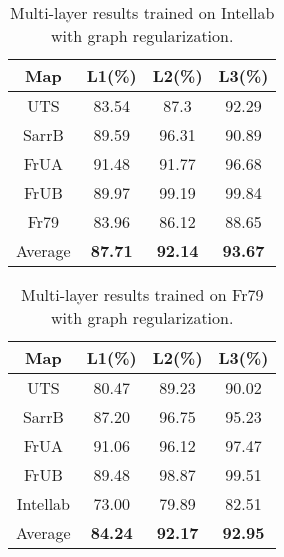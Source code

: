 \documentclass[letterpaper, 10 pt, conference]{ieeeconf}  %
\begin{document}
\begin{table}[pb]
\caption{Multi-layer results trained on Intellab with graph regularization.}
\label{intel}
\begin{center}
\begin{tabular}{cccc}
Map     &L1(\%)     &L2(\%)     &L3(\%)   \\
\hline
UTS     &83.54	    &87.3	    &92.29\\
SarrB   &89.59	    &96.31      &90.89\\
FrUA    &91.48	    &91.77	    &96.68\\
FrUB    &89.97	    &99.19	    &99.84\\
Fr79    &83.96	    &86.12	    &88.65\\
Average     &\textbf{87.71}	    &\textbf{92.14}	    &\textbf{93.67}\\
\end{tabular}
\end{center}
\end{table}

\begin{table}[pb]
\caption{Multi-layer results trained on Fr79 with graph regularization.}
\label{fr79}
\begin{center}
\begin{tabular}{cccc}
Map     &L1(\%)     &L2(\%)     &L3(\%)   \\
\hline
UTS     &80.47	    &89.23	    &90.02\\
SarrB   &87.20	    &96.75      &95.23\\
FrUA    &91.06	    &96.12	    &97.47\\
FrUB    &89.48	    &98.87	    &99.51\\
Intellab    &73.00	    &79.89	    &82.51\\
Average     &\textbf{84.24}	    &\textbf{92.17}	    &\textbf{92.95}\\
\end{tabular}
\end{center}
\end{table}
\end{document}
